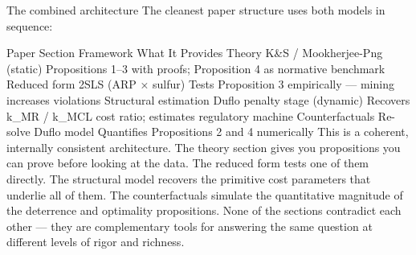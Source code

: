 The combined architecture
The cleanest paper structure uses both models in sequence:

Paper Section	Framework	What It Provides
Theory	K&S / Mookherjee-Png (static)	Propositions 1–3 with proofs; Proposition 4 as normative benchmark
Reduced form	2SLS (ARP × sulfur)	Tests Proposition 3 empirically — mining increases violations
Structural estimation	Duflo penalty stage (dynamic)	Recovers k_MR / k_MCL cost ratio; estimates regulatory machine
Counterfactuals	Re-solve Duflo model	Quantifies Propositions 2 and 4 numerically
This is a coherent, internally consistent architecture. The theory section gives you propositions you can prove before looking at the data. The reduced form tests one of them directly. The structural model recovers the primitive cost parameters that underlie all of them. The counterfactuals simulate the quantitative magnitude of the deterrence and optimality propositions. None of the sections contradict each other — they are complementary tools for answering the same question at different levels of rigor and richness.